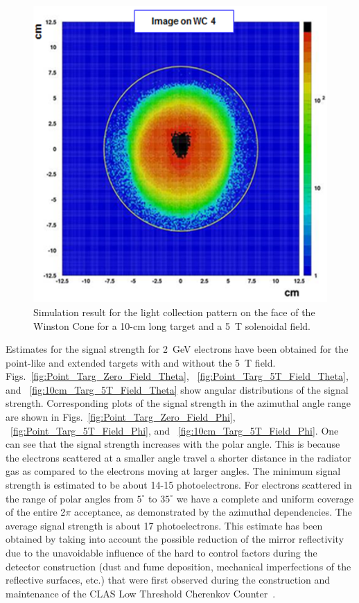 \begin{figure}[!ht]
    \centering
    \includegraphics[width=1.0\linewidth,trim={0.0cm 0.0cm 0.0cm 0.0cm},clip]{images/10cm_Targ_5T_Field_WCone.png}
    \caption{Simulation result for the light collection pattern on the face of the Winston Cone for a 10-cm long target
      and a 5~T solenoidal field.}
    \label{fig:10cm_Targ_5T_Field_WCone}
\end{figure}

Estimates for the signal strength for 2~GeV electrons have been obtained for the point-like and extended targets
with and without the 5~T field. Figs.~\ref{fig:Point_Targ_Zero_Field_Theta}, 
~\ref{fig:Point_Targ_5T_Field_Theta}, and ~\ref{fig:10cm_Targ_5T_Field_Theta} show angular distributions of
the signal strength. Corresponding plots of the signal strength in the azimuthal angle range are shown in
Figs.~\ref{fig:Point_Targ_Zero_Field_Phi}, ~\ref{fig:Point_Targ_5T_Field_Phi}, and 
~\ref{fig:10cm_Targ_5T_Field_Phi}. One can see that the signal strength increases with the polar angle. This
is because the electrons scattered at a smaller angle travel a shorter distance in the radiator gas as compared to
the electrons moving at larger angles. The minimum signal strength is estimated to be about 14-15 photoelectrons.
For electrons scattered in the range of polar angles from $5^\circ$ to $35^\circ$ we have a complete and uniform
coverage of the entire 2$\pi$ acceptance, as demonstrated by the azimuthal dependencies. The average signal
strength is about 17 photoelectrons. This estimate has been obtained by taking into account the possible reduction of
the mirror reflectivity due to the unavoidable influence of the hard to control factors during the detector construction
(dust and fume deposition, mechanical imperfections of the reflective surfaces, etc.) that were first observed during
the construction and maintenance of the CLAS Low Threshold Cherenkov Counter~\cite{Adams:2001kk}.

